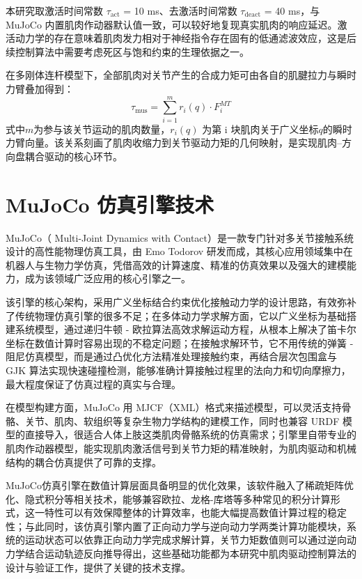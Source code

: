 本研究取激活时间常数 $\tau_{\text{act}}$ = 10 ms、去激活时间常数 $\tau_{\text{deact}}$ = 40 ms，与 MuJoCo 内置肌肉作动器默认值一致，可以较好地复现真实肌肉的响应延迟。激活动力学的存在意味着肌肉发力相对于神经指令存在固有的低通滤波效应，这是后续控制算法中需要考虑死区与饱和约束的生理依据之一。

在多刚体连杆模型下，全部肌肉对关节产生的合成力矩可由各自的肌腱拉力与瞬时力臂叠加得到：
\begin{equation}
\tau_{\text{mus}} = \sum_{i=1}^{m} r_i(q) \cdot F_i^{MT}
\label{eq:muscle-torque}
\end{equation}
式中$ m $为参与该关节运动的肌肉数量，$r_i(q)$ 为第 i 块肌肉关于广义坐标$ q $的瞬时力臂向量。该关系刻画了肌肉收缩力到关节驱动力矩的几何映射，是实现肌肉–方向盘耦合驱动的核心环节。
\section{MuJoCo 仿真引擎技术}
MuJoCo（ Multi-Joint Dynamics with Contact）是一款专门针对多关节接触系统设计的高性能物理仿真工具，由 Emo Todorov 研发而成，其核心应用领域集中在机器人与生物力学仿真，凭借高效的计算速度、精准的仿真效果以及强大的建模能力，成为该领域广泛应用的核心引擎之一。

该引擎的核心架构，采用广义坐标结合约束优化接触动力学的设计思路，有效弥补了传统物理仿真引擎的很多不足；在多体动力学求解方面，它以广义坐标为基础搭建系统模型，通过递归牛顿 - 欧拉算法高效求解运动方程，从根本上解决了笛卡尔坐标在数值计算时容易出现的不稳定问题；在接触求解环节，它不用传统的弹簧 - 阻尼仿真模型，而是通过凸优化方法精准处理接触约束，再结合层次包围盒与 GJK 算法实现快速碰撞检测，能够准确计算接触过程里的法向力和切向摩擦力，最大程度保证了仿真过程的真实与合理\cite{tu2026jiyu}。

在模型构建方面，MuJoCo 用 MJCF（XML）格式来描述模型，可以灵活支持骨骼、关节、肌肉、软组织等复杂生物力学结构的建模工作，同时也兼容 URDF 模型的直接导入，很适合人体上肢这类肌肉骨骼系统的仿真需求；引擎里自带专业的肌肉作动器模型，能实现肌肉激活信号到关节力矩的精准映射，为肌肉驱动和机械结构的耦合仿真提供了可靠的支撑\cite{liu2026noncontact}。

MuJoCo仿真引擎在数值计算层面具备明显的优化效果，该软件融入了稀疏矩阵优化、隐式积分等相关技术，能够兼容欧拉、龙格-库塔等多种常见的积分计算形式，这一特性可以有效保障整体的计算效率，也能大幅提高数值计算过程的稳定性；与此同时，该仿真引擎内置了正向动力学与逆向动力学两类计算功能模块，系统的运动状态可以依靠正向动力学完成求解计算，关节力矩数值则可以通过逆向动力学结合运动轨迹反向推导得出，这些基础功能都为本研究中肌肉驱动控制算法的设计与验证工作，提供了关键的技术支撑\cite{keaveny2026effects}。

